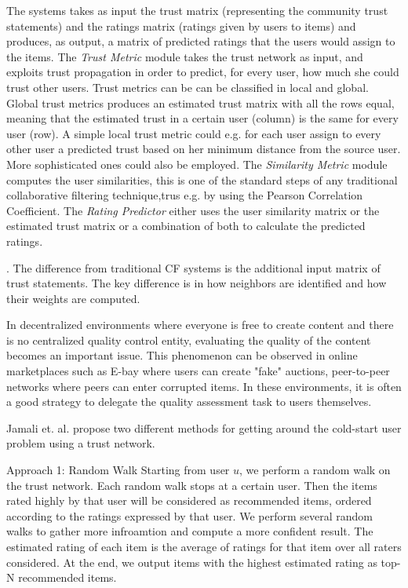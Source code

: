 The systems takes as input the trust matrix (representing the community trust statements) and the ratings matrix (ratings given by users to items) and produces, as output, a matrix of predicted ratings that the users would assign to the items. The \emph{Trust Metric} module takes the trust network as input, and exploits trust propagation in order to predict, for every user, how much she could trust other users. Trust metrics can be can be classified in local and global. Global trust metrics produces an estimated trust matrix with all the rows equal, meaning that the estimated trust in a certain user (column) is the same for every user (row). A simple local trust metric could e.g. for each user assign to every other user a predicted trust based on her minimum distance from the source user. More sophisticated ones could also be employed. The \emph{Similarity Metric} module computes the user similarities, this is one of the standard steps of any traditional collaborative filtering technique,trus e.g. by using the Pearson Correlation Coefficient. The \emph{Rating Predictor} either uses the user similarity matrix or the estimated trust matrix or a combination of both to calculate the predicted ratings.

. The difference from traditional CF systems is the additional input matrix of trust statements. The key difference is in how neighbors are identified and how their weights are computed. 

In decentralized environments where everyone is free to create content and there is no centralized quality control entity, evaluating the quality of the content becomes an important issue. This phenomenon can be observed in online marketplaces such as E-bay where users can create "fake" auctions, peer-to-peer networks where peers can enter corrupted items. In these environments, it is often a good strategy to delegate the quality assessment task to users themselves.


Jamali et. al. \cite{Jamali2009} propose two different methods for getting around the cold-start user problem using a trust network. 

Approach 1: Random Walk
Starting from user $u$, we perform a random walk on the trust network. Each random walk stops at a certain user. Then the items rated highly by that user will be considered as recommended items, ordered according to the ratings expressed by that user. We perform several random walks to gather more infroamtion and compute a more confident result. The estimated rating of each item is the average of ratings for that item over all raters considered. At the end, we output items with the highest estimated rating as top-N recommended items.

